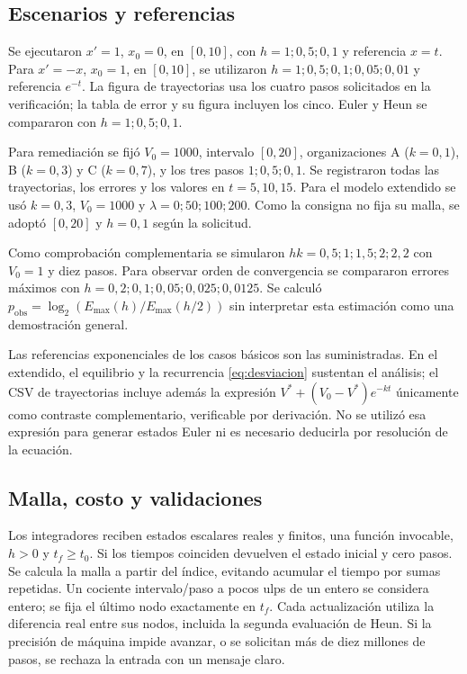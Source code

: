 \documentclass[11pt,a4paper]{article}
\begin{document}
\subsection{Escenarios y referencias}
Se ejecutaron $x'=1$, $x_0=0$, en $[0,10]$, con $h=1;0,5;0,1$ y referencia $x=t$. Para $x'=-x$, $x_0=1$, en $[0,10]$, se utilizaron $h=1;0,5;0,1;0,05;0,01$ y referencia $e^{-t}$. La figura de trayectorias usa los cuatro pasos solicitados en la verificación; la tabla de error y su figura incluyen los cinco. Euler y Heun se compararon con $h=1;0,5;0,1$.

Para remediación se fijó $V_0=1000$, intervalo $[0,20]$, organizaciones A ($k=0,1$), B ($k=0,3$) y C ($k=0,7$), y los tres pasos $1;0,5;0,1$. Se registraron todas las trayectorias, los errores y los valores en $t=5,10,15$. Para el modelo extendido se usó $k=0,3$, $V_0=1000$ y $\lambda=0;50;100;200$. Como la consigna no fija su malla, se adoptó $[0,20]$ y $h=0,1$ según la solicitud.

Como comprobación complementaria se simularon $hk=0,5;1;1,5;2;2,2$ con $V_0=1$ y diez pasos. Para observar orden de convergencia se compararon errores máximos con $h=0,2;0,1;0,05;0,025;0,0125$. Se calculó $p_{\mathrm{obs}}=\log_2(E_{\max}(h)/E_{\max}(h/2))$ sin interpretar esta estimación como una demostración general.

Las referencias exponenciales de los casos básicos son las suministradas. En el extendido, el equilibrio y la recurrencia \ref{eq:desviacion} sustentan el análisis; el CSV de trayectorias incluye además la expresión $V^*+(V_0-V^*)e^{-kt}$ únicamente como contraste complementario, verificable por derivación. No se utilizó esa expresión para generar estados Euler ni es necesario deducirla por resolución de la ecuación.

\subsection{Malla, costo y validaciones}
Los integradores reciben estados escalares reales y finitos, una función invocable, $h>0$ y $t_f\ge t_0$. Si los tiempos coinciden devuelven el estado inicial y cero pasos. Se calcula la malla a partir del índice, evitando acumular el tiempo por sumas repetidas. Un cociente intervalo/paso a pocos ulps de un entero se considera entero; se fija el último nodo exactamente en $t_f$. Cada actualización utiliza la diferencia real entre sus nodos, incluida la segunda evaluación de Heun. Si la precisión de máquina impide avanzar, o se solicitan más de diez millones de pasos, se rechaza la entrada con un mensaje claro.
\end{document}
